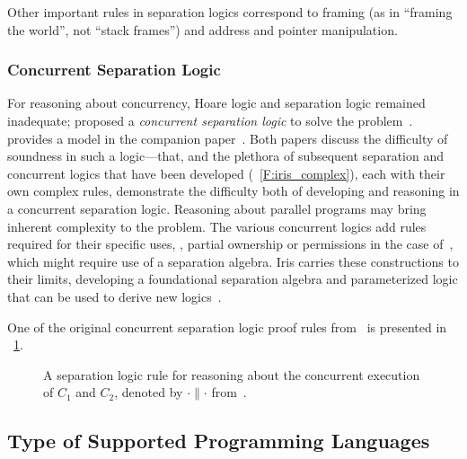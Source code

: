 Other important rules in separation logics correspond to framing (as in
``framing the world'', not ``stack frames'') and address and pointer manipulation.

\subsubsection{Concurrent Separation Logic}

For reasoning about concurrency, Hoare logic and separation logic remained
inadequate; \citeauthor{O_Hearn_2007} proposed a \emph{concurrent separation
logic} to solve the problem~\cite{O_Hearn_2007}. \citeauthor{Brookes_2007}
provides a model in the companion paper~\cite{Brookes_2007}. Both papers discuss
the difficulty of soundness in such a logic---that, and the plethora of
subsequent separation and concurrent logics that have been developed
(\figurename~\ref{F:iris_complex}), each with their own complex rules,
demonstrate the difficulty both of developing and reasoning in a concurrent
separation logic. Reasoning about parallel programs may bring inherent
complexity to the problem. The various concurrent logics add rules required for
their specific uses, \eg, partial ownership or permissions in the case
of~\cite{Appel_2011}, which might require use of a separation algebra. Iris
carries these constructions to their limits, developing a foundational
separation algebra and parameterized logic that can be used to derive new
logics~\cite{Jung_2018b}.

One of the original concurrent separation logic proof rules
from~\cite{O_Hearn_2007} is presented in \figurename~\ref{F:CSL_ex}.

\begin{figure}
    \centering
    \caption{A separation logic rule for reasoning about the concurrent
    execution of \(C_1\) and \(C_2\), denoted by \(\cdot \parallel \cdot\)
    from~\cite{O_Hearn_2007}.}\label{F:CSL_ex}
\end{figure}

\subsection{Type of Supported Programming Languages}\label{S:t_pl}

